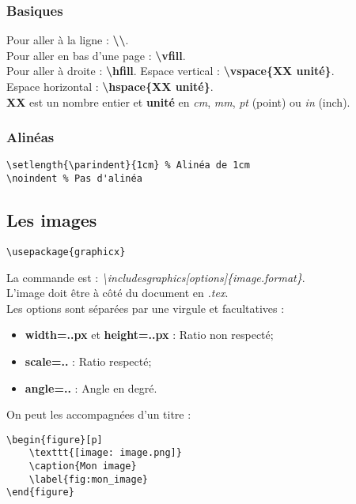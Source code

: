             \subsubsection{Basiques}
                Pour aller à la ligne : \textbf{\textbackslash\textbackslash}.\\
                Pour aller en bas d'une page : \textbf{\textbackslash vfill}.\\
                Pour aller à droite : \textbf{\textbackslash hfill}.
                Espace vertical : \textbf{\textbackslash vspace\{XX unité\}}.\\
                Espace horizontal : \textbf{\textbackslash hspace\{XX unité\}}.\\
                \textbf{XX} est un nombre entier et \textbf{unité} en \textit{cm}, \textit{mm}, \textit{pt} (point) ou \textit{in} (inch).
            \subsubsection{Alinéas}
                \begin{lstlisting}
\setlength{\parindent}{1cm} % Alinéa de 1cm
\noindent % Pas d'alinéa
                \end{lstlisting}
        \subsection{Les images}
            \begin{lstlisting}
\usepackage{graphicx}
            \end{lstlisting}
            La commande est : \textit{\textbackslash includesgraphics[options]\{image.format\}}.\\
            L'image doit être à côté du document en \textit{.tex}.\\
            Les options sont séparées par une virgule et facultatives :
            \begin{itemize}
                \item \textbf{width=..px} et \textbf{height=..px} : Ratio non respecté;
                \item \textbf{scale=..} : Ratio respecté;
                \item \textbf{angle=..} : Angle en degré.
            \end{itemize}
            On peut les accompagnées d'un titre :
            \begin{lstlisting}
\begin{figure}[p]
    \texttt{[image: image.png]}
    \caption{Mon image}
    \label{fig:mon_image}
\end{figure}
            \end{lstlisting}
